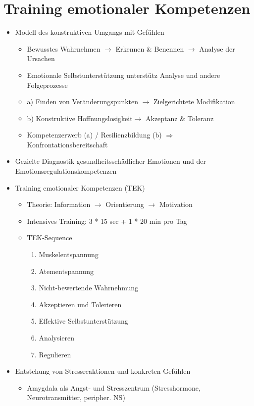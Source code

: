 \documentclass[11pt, paper=a4, twocolumn]{scrartcl}
\begin{document}
	\section{Training emotionaler Kompetenzen}
		\begin{itemize}
			\item Modell des konstruktiven Umgangs mit Gefühlen
				\begin{itemize}
					\item Bewusstes Wahrnehmen $\rightarrow$ Erkennen \& Benennen $\rightarrow$ Analyse der Ursachen
					\item Emotionale Selbstunterstützung unterstütz Analyse und andere Folgeprozesse
					\item a) Finden von Veränderungspunkten $\rightarrow$ Zielgerichtete Modifikation
					\item b) Konstruktive Hoffnungslosigkeit$\rightarrow$ Akzeptanz \& Toleranz
					\item Kompetenzerwerb (a) / Resilienzbildung (b) $\Rightarrow$ Konfrontationsbereitschaft
				\end{itemize}
			\item Gezielte Diagnostik gesundheitsschädlicher Emotionen und der Emotionsregulationskompetenzen
			\item Training emotionaler Kompetenzen (TEK)
				\begin{itemize}
					\item Theorie: Information $\rightarrow$ Orientierung $\rightarrow$ Motivation
					\item Intensives Training: 3 * 15 sec + 1 * 20 min pro Tag
					\item TEK-Sequence
						\begin{enumerate}
							\item Muskelentspannung
							\item Atementspannung
							\item Nicht-bewertende Wahrnehmung
							\item Akzeptieren und Tolerieren
							\item Effektive Selbstunterstützung
							\item Analysieren
							\item Regulieren
						\end{enumerate}
				\end{itemize}
			\item Entstehung von Stressreaktionen und konkreten Gefühlen
				\begin{itemize}
					\item Amygdala als Angst- und Stresszentrum (Stresshormone, Neurotransmitter, peripher. NS) 

\end{itemize}
\end{itemize}
\end{document}
